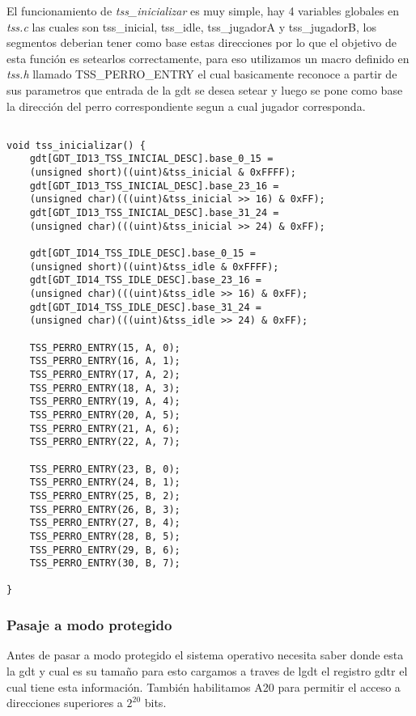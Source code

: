 El funcionamiento de \textit{tss\_inicializar} es muy simple, hay 4 variables globales en \textit{tss.c} las cuales son tss\_inicial, tss\_idle, tss\_jugadorA y tss\_jugadorB, los segmentos deberian tener como base estas direcciones por lo que el objetivo de esta función es setearlos correctamente, para eso utilizamos un macro definido en \textit{tss.h} llamado TSS\_PERRO\_ENTRY el cual basicamente reconoce a partir de sus parametros que entrada de la gdt se desea setear y luego se pone como base la dirección del perro correspondiente segun a cual jugador corresponda.

\begin{lstlisting}

void tss_inicializar() {
	gdt[GDT_ID13_TSS_INICIAL_DESC].base_0_15 = 
	(unsigned short)((uint)&tss_inicial & 0xFFFF);
	gdt[GDT_ID13_TSS_INICIAL_DESC].base_23_16 = 
	(unsigned char)(((uint)&tss_inicial >> 16) & 0xFF);
	gdt[GDT_ID13_TSS_INICIAL_DESC].base_31_24 = 
	(unsigned char)(((uint)&tss_inicial >> 24) & 0xFF);

	gdt[GDT_ID14_TSS_IDLE_DESC].base_0_15 = 
	(unsigned short)((uint)&tss_idle & 0xFFFF);
	gdt[GDT_ID14_TSS_IDLE_DESC].base_23_16 = 
	(unsigned char)(((uint)&tss_idle >> 16) & 0xFF);
	gdt[GDT_ID14_TSS_IDLE_DESC].base_31_24 = 
	(unsigned char)(((uint)&tss_idle >> 24) & 0xFF);

	TSS_PERRO_ENTRY(15, A, 0);
	TSS_PERRO_ENTRY(16, A, 1);
	TSS_PERRO_ENTRY(17, A, 2);
	TSS_PERRO_ENTRY(18, A, 3);
	TSS_PERRO_ENTRY(19, A, 4);
	TSS_PERRO_ENTRY(20, A, 5);
	TSS_PERRO_ENTRY(21, A, 6);
	TSS_PERRO_ENTRY(22, A, 7);

	TSS_PERRO_ENTRY(23, B, 0);
	TSS_PERRO_ENTRY(24, B, 1);
	TSS_PERRO_ENTRY(25, B, 2);
	TSS_PERRO_ENTRY(26, B, 3);
	TSS_PERRO_ENTRY(27, B, 4);
	TSS_PERRO_ENTRY(28, B, 5);
	TSS_PERRO_ENTRY(29, B, 6);
	TSS_PERRO_ENTRY(30, B, 7);

}

\end{lstlisting}

\subsubsection{Pasaje a modo protegido}

Antes de pasar a modo protegido el sistema operativo necesita saber donde esta la gdt y cual es su tamaño para esto cargamos a traves de lgdt el registro gdtr el cual tiene esta información. También habilitamos A20 para permitir el acceso a direcciones superiores a $2^{20}$ bits.

